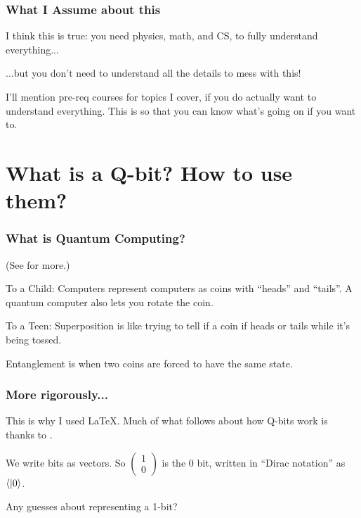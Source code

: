 \documentclass{beamer}
\begin{document}
\begin{frame}
\frametitle{What I Assume about this}
I think this is true: you need physics, math, and CS, to fully understand everything... 

...but you don't need to understand all the details to mess with this!

I'll mention pre-req courses for topics I cover, if you do actually want to understand everything.
This is so that you can know what's going on if you want to.
\end{frame}

\section{What is a Q-bit? How to use them?}

\begin{frame}
\frametitle{What is Quantum Computing?}

(See \cite{5-levels} for more.)

\begin{block}{To a Child:}
Computers represent computers as coins with ``heads'' and ``tails''. A quantum computer also lets you rotate the coin.
\end{block}

\begin{block}{To a Teen:}
Superposition is like trying to tell if a coin if heads or tails while it's being tossed.

Entanglement is when two coins are forced to have the same state.
\end{block}
\end{frame}

\begin{frame}
\frametitle{More rigorously...}

This is why I used \LaTeX.
Much of what follows about how Q-bits work is thanks to \cite{long-video}.

\begin{definition}
    We write bits as vectors. So $\begin{pmatrix}1 \\ 0\end{pmatrix}$ is the $0$ bit,
    written in ``Dirac notation'' as
    $\braket{|0}$.
\end{definition}

Any guesses about representing a 1-bit?
\end{frame}
\end{document}
